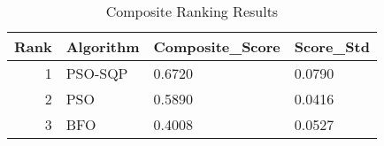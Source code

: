 \begin{table}
\caption{Composite Ranking Results}
\label{tab:composite_ranking}
\begin{tabular}{rlll}
\toprule
Rank & Algorithm & Composite_Score & Score_Std \\
\midrule
1 & PSO-SQP & 0.6720 & 0.0790 \\
2 & PSO & 0.5890 & 0.0416 \\
3 & BFO & 0.4008 & 0.0527 \\
\bottomrule
\end{tabular}
\end{table}
